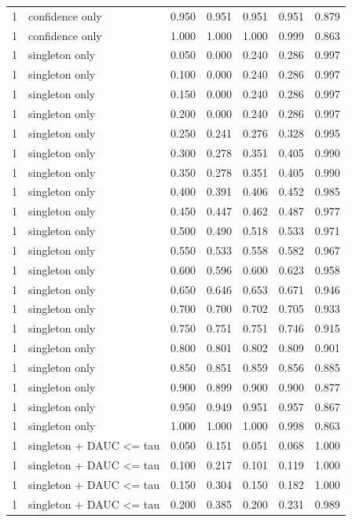 \begin{tabular}{rlrrrrr}
1 & confidence only & 0.950 & 0.951 & 0.951 & 0.951 & 0.879 \\
1 & confidence only & 1.000 & 1.000 & 1.000 & 0.999 & 0.863 \\
1 & singleton only & 0.050 & 0.000 & 0.240 & 0.286 & 0.997 \\
1 & singleton only & 0.100 & 0.000 & 0.240 & 0.286 & 0.997 \\
1 & singleton only & 0.150 & 0.000 & 0.240 & 0.286 & 0.997 \\
1 & singleton only & 0.200 & 0.000 & 0.240 & 0.286 & 0.997 \\
1 & singleton only & 0.250 & 0.241 & 0.276 & 0.328 & 0.995 \\
1 & singleton only & 0.300 & 0.278 & 0.351 & 0.405 & 0.990 \\
1 & singleton only & 0.350 & 0.278 & 0.351 & 0.405 & 0.990 \\
1 & singleton only & 0.400 & 0.391 & 0.406 & 0.452 & 0.985 \\
1 & singleton only & 0.450 & 0.447 & 0.462 & 0.487 & 0.977 \\
1 & singleton only & 0.500 & 0.490 & 0.518 & 0.533 & 0.971 \\
1 & singleton only & 0.550 & 0.533 & 0.558 & 0.582 & 0.967 \\
1 & singleton only & 0.600 & 0.596 & 0.600 & 0.623 & 0.958 \\
1 & singleton only & 0.650 & 0.646 & 0.653 & 0.671 & 0.946 \\
1 & singleton only & 0.700 & 0.700 & 0.702 & 0.705 & 0.933 \\
1 & singleton only & 0.750 & 0.751 & 0.751 & 0.746 & 0.915 \\
1 & singleton only & 0.800 & 0.801 & 0.802 & 0.809 & 0.901 \\
1 & singleton only & 0.850 & 0.851 & 0.859 & 0.856 & 0.885 \\
1 & singleton only & 0.900 & 0.899 & 0.900 & 0.900 & 0.877 \\
1 & singleton only & 0.950 & 0.949 & 0.951 & 0.957 & 0.867 \\
1 & singleton only & 1.000 & 1.000 & 1.000 & 0.998 & 0.863 \\
1 & singleton + DAUC <= tau & 0.050 & 0.151 & 0.051 & 0.068 & 1.000 \\
1 & singleton + DAUC <= tau & 0.100 & 0.217 & 0.101 & 0.119 & 1.000 \\
1 & singleton + DAUC <= tau & 0.150 & 0.304 & 0.150 & 0.182 & 1.000 \\
1 & singleton + DAUC <= tau & 0.200 & 0.385 & 0.200 & 0.231 & 0.989 \\

\end{tabular}
